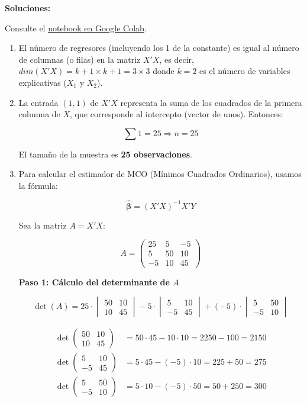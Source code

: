 \documentclass[10pt,a4paper]{article}
\begin{document}
{\color{red}\textbf{Soluciones:} 

Consulte el \href{https://colab.research.google.com/drive/1JLs2y2GP7e8erfcqnqRdP3Y1xGbyBB3H#scrollTo=GmtaihUVZNeU}{notebook en Google Colab}.


\begin{enumerate}
    \item[(1)] El número de regresores (incluyendo los 1 de la constante) es igual al número de columnas (o filas) en la matriz \( X'X \), es decir, $dim ( X'X)=k+1 \times k+1=3\times 3 $ donde $k=2$ es el número de variables explicativas  (\( X_1 \) y \( X_2 \)).

    \item[(2)]  La entrada \( (1,1) \) de \( X'X \) representa la suma de los cuadrados de la primera columna de \( X \), que corresponde al intercepto (vector de unos). Entonces:

    \[
    \sum 1 = 25 \Rightarrow n = 25
    \]

    El tamaño de la muestra es \textbf{25 observaciones}.

    \item[(3)] Para calcular el estimador de MCO (Mínimos Cuadrados Ordinarios), usamos la fórmula:

    \[
    \hat{\bm{\beta}} = (X'X)^{-1} X'Y
    \]

  Sea la matriz \( A = X'X \):

\[
A = \begin{pmatrix}
25 & 5 & -5 \\
5 & 50 & 10 \\
-5 & 10 & 45
\end{pmatrix}
\]

{\bf Paso 1: Cálculo del determinante de \( A \)}

\[
\det(A) =
25 \cdot \begin{vmatrix}
50 & 10 \\
10 & 45
\end{vmatrix}
- 5 \cdot \begin{vmatrix}
5 & 10 \\
-5 & 45
\end{vmatrix}
+ (-5) \cdot \begin{vmatrix}
5 & 50 \\
-5 & 10
\end{vmatrix}
\]

\begin{align*}
\det \begin{pmatrix} 50 & 10 \\ 10 & 45 \end{pmatrix} &= 50 \cdot 45 - 10 \cdot 10 = 2250 - 100 = 2150 \\
\det \begin{pmatrix} 5 & 10 \\ -5 & 45 \end{pmatrix} &= 5 \cdot 45 - (-5) \cdot 10 = 225 + 50 = 275 \\
\det \begin{pmatrix} 5 & 50 \\ -5 & 10 \end{pmatrix} &= 5 \cdot 10 - (-5) \cdot 50 = 50 + 250 = 300
\end{align*}


\end{enumerate}}
\end{document}
